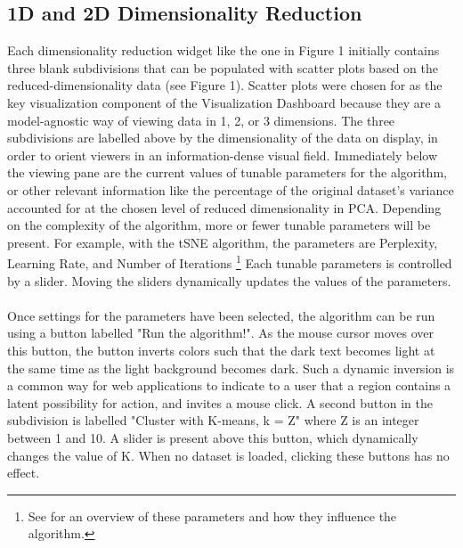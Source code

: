 \documentclass{sigchi}
\begin{document}
\subsection{1D and 2D Dimensionality Reduction}
%
%
Each dimensionality reduction widget like the one in Figure 1 initially contains three blank subdivisions that can be populated with scatter plots based on the reduced-dimensionality data (see Figure 1). %
%
Scatter plots were chosen for as the key visualization component of the Visualization Dashboard because they are a model-agnostic way of viewing data in 1, 2, or 3 dimensions. %
%
The three subdivisions are labelled above by the dimensionality of the data on display, in order to orient viewers in an information-dense visual field. %
%
Immediately below the viewing pane are the current values of tunable parameters for the algorithm, or other relevant information like the percentage of the original dataset's variance accounted for at the chosen level of reduced dimensionality in PCA. %
%
Depending on the complexity of the algorithm, more or fewer tunable parameters will be present. %
%
For example, with the tSNE algorithm, the parameters are Perplexity, Learning Rate, and Number of Iterations%
%
\footnote{See \cite{wattenberg2016how} for an overview of these parameters and how they influence the algorithm.} %
%
Each tunable parameters is controlled by a slider. %
%
Moving the sliders dynamically updates the values of the parameters. %
\\\\
%
Once settings for the parameters have been selected, the algorithm can be run using a button labelled "Run the algorithm!". %
%
As the mouse cursor moves over this button, the button inverts colors such that the dark text becomes light at the same time as the light background becomes dark. %
%
Such a dynamic inversion is a common way for web applications to indicate to a user that a region contains a latent possibility for action, and invites a mouse click. %
%
A second button in the subdivision is labelled "Cluster with K-means, k = Z" where Z is an integer between 1 and 10. %
%
A slider is present above this button, which dynamically changes the value of K. %
%
When no dataset is loaded, clicking these buttons has no effect.
%
%
\end{document}
